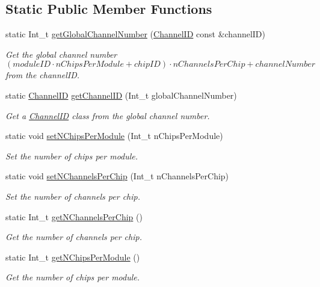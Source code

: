 \subsection*{Static Public Member Functions}
\begin{DoxyCompactItemize}
\item 
static Int\-\_\-t \hyperlink{class_spectrum_properties_run_info_a37a1ce79abc052318a89ada72699058c}{get\-Global\-Channel\-Number} (\hyperlink{class_spectrum_properties_run_info_1_1_channel_i_d}{Channel\-I\-D} const \&channel\-I\-D)
\begin{DoxyCompactList}\small\item\em Get the global channel number $( moduleID \cdot nChipsPerModule + chipID ) \cdot nChannelsPerChip + channelNumber $ from the channel\-I\-D. \end{DoxyCompactList}\item 
static \hyperlink{class_spectrum_properties_run_info_1_1_channel_i_d}{Channel\-I\-D} \hyperlink{class_spectrum_properties_run_info_a0183a3e0b2724b37e0221aee0ef8195a}{get\-Channel\-I\-D} (Int\-\_\-t global\-Channel\-Number)
\begin{DoxyCompactList}\small\item\em Get a \hyperlink{class_spectrum_properties_run_info_1_1_channel_i_d}{Channel\-I\-D} class from the global channel number. \end{DoxyCompactList}\item 
static void \hyperlink{class_spectrum_properties_run_info_a5436dc62d308bcbea52a034a001e1555}{set\-N\-Chips\-Per\-Module} (Int\-\_\-t n\-Chips\-Per\-Module)
\begin{DoxyCompactList}\small\item\em Set the number of chips per module. \end{DoxyCompactList}\item 
static void \hyperlink{class_spectrum_properties_run_info_aee98003379da6688bd2e2cfca86b8ebc}{set\-N\-Channels\-Per\-Chip} (Int\-\_\-t n\-Channels\-Per\-Chip)
\begin{DoxyCompactList}\small\item\em Set the number of channels per chip. \end{DoxyCompactList}\item 
static Int\-\_\-t \hyperlink{class_spectrum_properties_run_info_a3d9d8e0ae2cef40794561409120e257c}{get\-N\-Channels\-Per\-Chip} ()
\begin{DoxyCompactList}\small\item\em Get the number of channels per chip. \end{DoxyCompactList}\item 
static Int\-\_\-t \hyperlink{class_spectrum_properties_run_info_aaac273064e2d136ef58e589c677aec94}{get\-N\-Chips\-Per\-Module} ()
\begin{DoxyCompactList}\small\item\em Get the number of chips per module. \end{DoxyCompactList}\end{DoxyCompactItemize}
